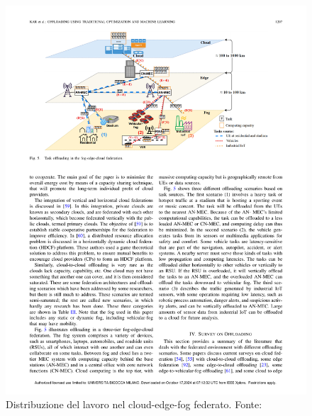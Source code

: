 \begin{figure}
    \centering
    \includegraphics[width=\textwidth]{assets/3/task_offloading_scenarios.pdf}
    \caption[Distribuzione del lavoro nel cloud-edge-fog federato]{Distribuzione del lavoro nel cloud-edge-fog federato. Fonte: \cite{Kar2023}}
    \label{fig:2_task_offloading_scenarios}
\end{figure}

